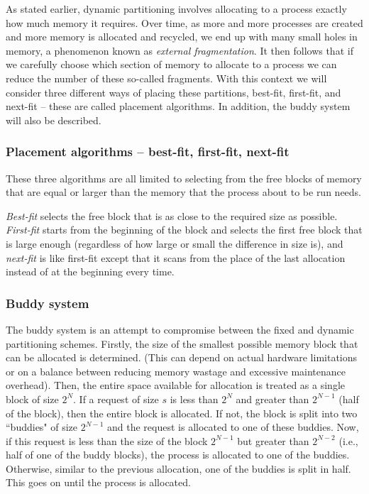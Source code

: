 \documentclass[12pt]{article}
\begin{document}
As stated earlier, dynamic partitioning involves allocating to a process
exactly how much memory it requires. Over time, as more and more processes
are created and more memory is allocated and recycled, we end up with many
small holes in memory, a phenomenon known as \textit{external fragmentation}.
It then follows that if we carefully choose which section of memory to allocate
to a process we can reduce the number of these so-called fragments. With this
context we will consider three different ways of placing these partitions,
best-fit, first-fit, and next-fit -- these are called placement algorithms.
In addition, the buddy system will also be described.

\subsubsection{Placement algorithms -- best-fit, first-fit, next-fit}
These three algorithms are all limited to selecting from the free blocks of
memory that are equal or larger than the memory that the process about to be
run needs.

\textit{Best-fit} selects the free block that is as close to the required size
as possible. \textit{First-fit} starts from the beginning of the block and
selects the first free block that is large enough (regardless of how large or
small the difference in size is), and \textit{next-fit} is like first-fit
except that it scans from the place of the last allocation instead of at the
beginning every time.

\subsubsection{Buddy system}
The buddy system is an attempt to compromise between the fixed and dynamic
partitioning schemes. Firstly, the size of the smallest possible memory block
that can be allocated is determined. (This can depend on actual hardware
limitations or on a balance between reducing memory wastage and excessive
maintenance overhead). Then, the entire space available for allocation is
treated as a single block of size $2^N$. If a request of size $s$ is less
than $2^N$ and greater than $2^{N-1}$ (half of the block), then the entire
block is allocated. If not, the block is split into two ``buddies" of size
$2^{N-1}$ and the request is allocated to one of these buddies. Now, if 
this request is less than the size of the block $2^{N-1}$
but greater than $2^{N-2}$ (i.e., half of one of the buddy blocks), the process
is allocated to one of the buddies. Otherwise, similar to the previous
allocation, one of the buddies is split in half. This goes on until the
process is allocated.
\end{document}
